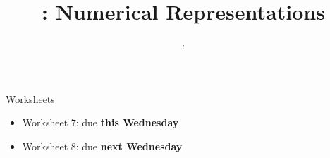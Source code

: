 \usepackage{../../beamerthemeFalmouthGamesAcademy}
\usepackage{multimedia}
\graphicspath{ {../../} }

\lstset{language=[Sharp]C}

\usepackage[normalem]{ulem}
\usepackage{wasysym}

\usepackage{pdfpages}


\usepackage{algpseudocode}
\usepackage{qtree}




\title{\sessionnumber: Numerical Representations}
\subtitle{\modulecode: \moduletitle}

\frame{\titlepage} 

\begin{frame}{Worksheets}
	\begin{itemize}
		\item Worksheet 7: due \textbf{this Wednesday}
		\item Worksheet 8: due \textbf{next Wednesday}
	\end{itemize}
\end{frame}





%


